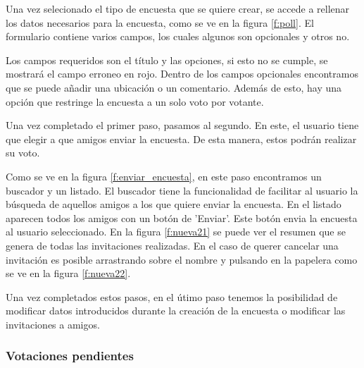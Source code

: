 \documentclass[a4paper, 12pt]{book}
\begin{document}
Una vez selecionado el tipo de encuesta que se quiere crear, se accede a rellenar los datos
necesarios para la encuesta, como se ve en la figura \ref{f:poll}. El formulario contiene varios campos, los
cuales algunos son opcionales y otros no.

Los campos requeridos son el t\'itulo y las opciones,
si esto no se cumple, se mostrar\'a el campo erroneo en rojo. Dentro de los campos opcionales 
encontramos que se puede a\~nadir una ubicaci\'on o un comentario. Adem\'as de esto, hay una opci\'on
que restringe la encuesta a un solo voto por votante.

Una vez completado el primer paso, pasamos al segundo. En este, el usuario tiene que elegir 
a que amigos enviar la encuesta. De esta manera, estos podr\'an realizar su voto. 

Como se ve en la figura \ref{f:enviar_encuesta}, en este paso encontramos un buscador y un listado. El buscador tiene la funcionalidad de facilitar al usuario
la b\'usqueda de aquellos amigos a los que quiere enviar la encuesta. En el listado aparecen todos los amigos
con un bot\'on de 'Enviar'. Este bot\'on envia la encuesta al usuario seleccionado. En la figura \ref{f:nueva21} 
se puede ver el resumen que se genera de todas las invitaciones realizadas. En el caso de querer cancelar
una invitaci\'on es posible arrastrando sobre el nombre y pulsando en la papelera como se ve en la figura \ref{f:nueva22}. 

Una vez completados estos pasos, en el \'utimo paso tenemos la posibilidad de modificar datos introducidos 
durante la creaci\'on de la encuesta o modificar las invitaciones a amigos. 


\subsubsection{Votaciones pendientes}
\label{sec:votacion_pendiente}
\end{document}
